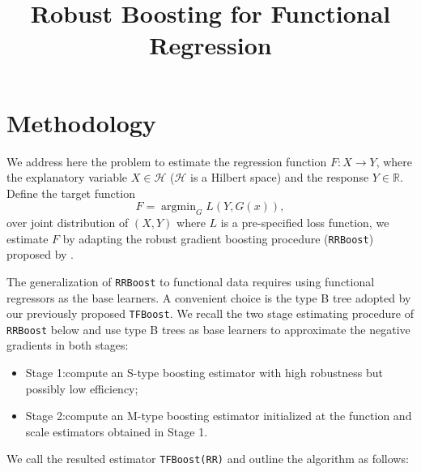 \documentclass{article}
\title{Robust Boosting for Functional Regression}
\DeclareMathOperator*{\argmin}{argmin}
\begin{document}
\maketitle

\section{Methodology}
We address here the problem to estimate the regression function $F: X \rightarrow Y$, where the explanatory variable $X \in \mathcal{H}$  ($\mathcal{H}$ is a Hilbert space) and the response $Y \in \mathbb{R}$. Define the target function 
$$F = \argmin_{G}L(Y, G(x)),$$
over joint distribution of $(X,Y)$ where $L$ is a pre-specified loss function, we estimate $F$ by adapting the robust gradient boosting procedure (\texttt{RRBoost}) proposed  by \cite{ju2021robust}. 

The generalization of \texttt{RRBoost} to functional data requires using functional regressors as the base learners. A convenient choice is the type B tree adopted by our previously proposed \texttt{TFBoost}. We recall the two stage estimating procedure of \texttt{RRBoost} below and use type B trees as base learners to approximate the negative gradients in both stages:
\begin{itemize}
\item Stage 1:compute an S-type boosting estimator with high robustness but possibly low efficiency;
\item Stage 2:compute an M-type boosting estimator initialized at the function and scale estimators obtained in Stage 1.	
\end{itemize}
We call the resulted estimator \texttt{TFBoost(RR)} and outline the algorithm as follows: 
\end{document}
